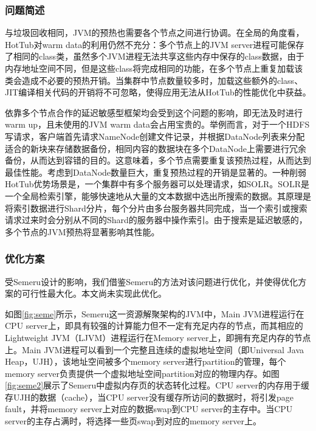 \documentclass[lang=cn,12pt,a4paper,cite=authoryear]{elegantpaper}
\begin{document}
\begin{figure*}[!htp]
\begin{figure*}[!htp]
\subsubsection{问题简述}
与垃圾回收相同，JVM的预热也需要各个节点之间进行协调。在全局的角度看，HotTub对warm data的利用仍然不充分：多个节点上的JVM server进程可能保存了相同的class类，虽然多个JVM进程无法共享这些内存中保存的class数据，由于内存地址空间不同，但是这些class将完成相同的功能，在多个节点上重复加载该类会造成不必要的预热开销。当集群中节点数量较多时，加载这些额外的class、JIT编译相关代码的开销将不可忽略，使得应用无法从HotTub的性能优化中获益。

依靠多个节点合作的延迟敏感型框架均会受到这个问题的影响，即无法及时进行warm up，且未使用的JVM warm data会占用宝贵的。举例而言，对于一个HDFS写请求，客户端首先请求NameNode创建文件记录，并根据DataNode列表来分配适合的新块来存储数据备份，相同内容的数据块在多个DataNode上需要进行冗余备份，从而达到容错的目的。这意味着，多个节点需要重复该预热过程，从而达到最佳性能。考虑到DataNode数量巨大，重复预热过程的开销是显著的。一种削弱HotTub优势场景是，一个集群中有多个服务器可以处理请求，如SOLR\cite{DBLP:journals/ercim/Brouwer17}。SOLR是一个全局检索引擎，能够快速地从大量的文本数据中选出所搜索的数据。其原理是将索引数据进行Shard分片，每个分片由多台服务器共同完成，当一个索引或搜索请求过来时会分别从不同的Shard的服务器中操作索引。由于搜索是延迟敏感的，多个节点的JVM预热将显著影响其性能。

\subsubsection{优化方案}
受Semeru设计的影响，我们借鉴Semeru的方法对该问题进行优化，并使得优化方案的可行性最大化。本文尚未实现此优化。

如图\ref{fig:seme}所示，Semeru这一资源解聚架构的JVM中，Main JVM进程运行在CPU server上，即具有较强的计算能力但不一定有充足内存的节点，而其相应的Lightweight JVM（LJVM）进程运行在Memory server上，即拥有充足内存的节点上。Main JVM进程可以看到一个完整且连续的虚拟地址空间（即Universal Java Heap，UJH），该地址空间被多个memory server进行partition的管理，每个memory server负责提供一个虚拟地址空间partition对应的物理内存。如图\ref{fig:seme2}展示了Semeru中虚拟内存页的状态转化过程。CPU server的内存用于缓存UJH的数据（cache），当CPU server没有缓存所访问的数据时，将引发page fault，并将memory server上对应的数据swap到CPU server的主存中。当CPU server的主存占满时，将选择一些页swap到对应的memory server上。

\end{figure*}
\end{figure*}
\end{document}
